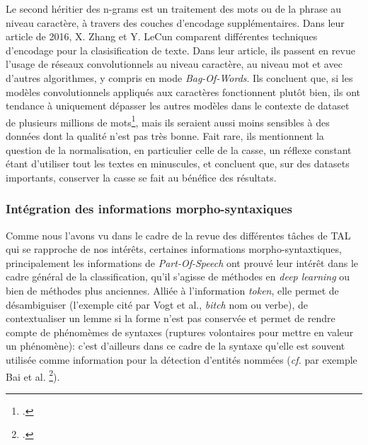 Le second héritier des n-grams est un traitement des mots ou de la phrase au niveau caractère, à travers des couches d'encodage supplémentaires. Dans leur article de 2016, X. Zhang et Y. LeCun comparent différentes techniques d'encodage pour la clasisification de texte. Dans leur article, ils passent en revue l'usage de réseaux convolutionnels au niveau caractère, au niveau mot et avec d'autres algorithmes, y compris en mode \textit{Bag-Of-Words}. Ils concluent que, si les modèles convolutionnels appliqués aux caractères fonctionnent plutôt bien, ils ont tendance à uniquement dépasser les autres modèles dans le contexte de dataset de plusieurs millions de mots\footcite[p. 7]{zhang_text_2016}, mais ils seraient aussi moins sensibles à des données dont la qualité n'est pas très bonne. Fait rare, ils mentionnent la question de la normalisation, en particulier celle de la casse, un réflexe constant étant d'utiliser tout les textes en minuscules, et concluent que, sur des datasets importants, conserver la casse se fait au bénéfice des résultats. 



\subsubsection{Intégration des informations morpho-syntaxiques}

Comme nous l'avons vu dans le cadre de la revue des différentes tâches de TAL qui se rapproche de nos intérêts, certaines informations morpho-syntaxtiques, principalement les informations de \textit{Part-Of-Speech} ont prouvé leur intérêt dans le cadre général de  la classification, qu'il s'agisse de méthodes en \textit{deep learning} ou bien de méthodes plus anciennes. Alliée à l'information \textit{token}, elle permet de désambiguiser (l'exemple cité par Vogt et al., \textit{bitch} nom ou verbe), de contextualiser un lemme si la forme n'est pas conservée et permet de rendre compte de phénomèmes de syntaxes (ruptures volontaires pour mettre en valeur un phénomène): c'est d'ailleurs dans ce cadre de la syntaxe qu'elle est souvent utilisée comme information pour la détection d'entités nommées (\textit{cf.} par exemple  Bai et al. \footcite{bai_adversarial_2020}). 

